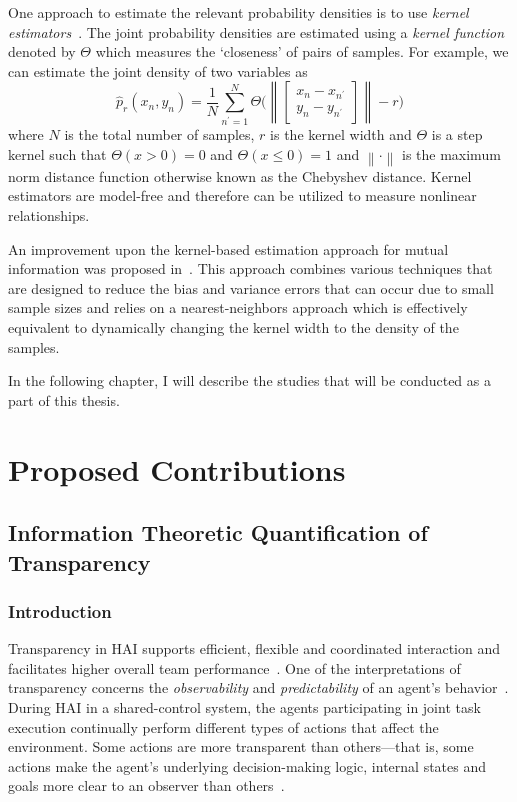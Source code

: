 \documentclass[12pt]{article}
\newcommand{\norm}[1]{\left\lVert#1\right\rVert}
\begin{document}
One approach to estimate the relevant probability densities is to use \textit{kernel estimators}~\cite{silverman1986density}. The joint probability densities are estimated using a \textit{kernel function} denoted by $\Theta$ which measures the `closeness' of pairs of samples. For example, we can estimate the joint density of two variables as 
\begin{equation*}
\hat{p}_r(x_n, y_n) = \frac{1}{N}\sum_{n^{\prime} = 1}^{N}\Theta\Bigg(\norm{\begin{bmatrix}
	x_n - x_{n^{\prime}} \\
	y_n - y_{n^{\prime}}
	\end{bmatrix}}-r\Bigg)
\end{equation*}  
where $N$ is the total number of samples, $r$ is the kernel width and $\Theta$ is a step kernel such that $\Theta(x > 0) = 0$ and $\Theta(x \leq 0) = 1$ and $\norm{\cdot}$ is the maximum norm distance function otherwise known as the Chebyshev distance. Kernel estimators are model-free and therefore can be utilized to measure nonlinear relationships. 

An improvement upon the kernel-based estimation approach for mutual information was proposed in~\cite{kraskov2004estimating}. This approach combines various techniques that are designed to reduce the bias and variance errors that can occur due to small sample sizes and relies on a nearest-neighbors approach which is effectively equivalent to dynamically changing the kernel width to the density of the samples. 

In the following chapter, I will describe the studies that will be conducted as a part of this thesis. 

\pagebreak
\section{Proposed Contributions}
\subsection{Information Theoretic Quantification of  Transparency}\label{study:rq1}

\subsubsection{Introduction}
Transparency in HAI supports efficient, flexible and coordinated interaction and facilitates higher overall team performance~\cite{lyons2013being}. One of the interpretations of transparency concerns the \textit{observability} and \textit{predictability} of an agent's behavior~\cite{endsley2017here}. During HAI in a shared-control system, the agents participating in joint task execution continually perform different types of actions that affect the environment. Some actions are more transparent than others---that is, some actions make the agent's underlying decision-making logic, internal states and goals more clear to an observer than others~\cite{theodorou2017designing}. 
\end{document}
